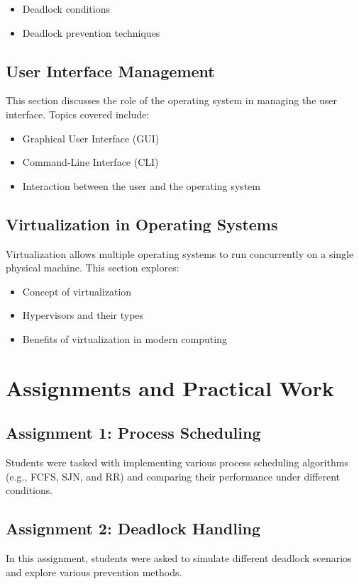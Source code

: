 \documentclass[12pt]{article}
\begin{document}
\begin{itemize}
    \item Deadlock conditions
    \item Deadlock prevention techniques
\end{itemize}

\subsection{User Interface Management}
This section discusses the role of the operating system in managing the user interface. Topics covered include:
\begin{itemize}
    \item Graphical User Interface (GUI)
    \item Command-Line Interface (CLI)
    \item Interaction between the user and the operating system
\end{itemize}

\subsection{Virtualization in Operating Systems}
Virtualization allows multiple operating systems to run concurrently on a single physical machine. This section explores:
\begin{itemize}
    \item Concept of virtualization
    \item Hypervisors and their types
    \item Benefits of virtualization in modern computing
\end{itemize}

\section{Assignments and Practical Work}
\subsection{Assignment 1: Process Scheduling}
Students were tasked with implementing various process scheduling algorithms (e.g., FCFS, SJN, and RR) and comparing their performance under different conditions.

\subsection{Assignment 2: Deadlock Handling}
In this assignment, students were asked to simulate different deadlock scenarios and explore various prevention methods.
\end{document}
